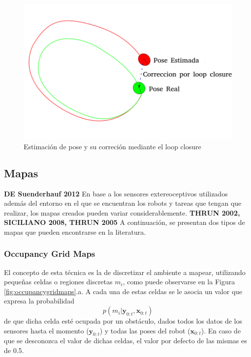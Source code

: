 \begin{figure}[!ht]
    \centering
    \includegraphics[width=\textwidth]{Img/Pose_LoopClosureCorr.png}
    \caption{Estimación de pose y su correción mediante el loop closure}
    \label{fig:poseloopclcorr}
\end{figure}

\subsection{Mapas}
\textbf{DE Suenderhauf 2012}
En base a los sensores extereoceptivos utilizados además del entorno en el que se encuentran los robots y tareas que tengan que realizar, los mapas creados pueden variar considerablemente. \textbf{THRUN 2002, SICILIANO 2008, THRUN 2005} A continuación, se presentan dos tipos de mapas que pueden encontrarse en la literatura.

\subsubsection{Occupancy Grid Maps}
El concepto de esta técnica es la de discretizar el ambiente a mapear, utilizando pequeñas celdas o regiones discretas $m_i$, como puede observarse en la Figura \ref{fig:occupancygridmaps}.a. A cada una de estas celdas se le asocia un valor que expresa la probabilidad
\begin{equation}
    p(m_i|\bm{y}_{0:t},\bm{x}_{0:t})
\end{equation}
de que dicha celda esté ocupada por un obstáculo, dados todos los datos de los sensores hasta el momento ($\bm{y}_{0:t}$) y todas las poses del robot ($\bm{x}_{0:t}$). En caso de que se desconozca el valor de dichas celdas, el valor por defecto de las mismas es de 0.5. 

